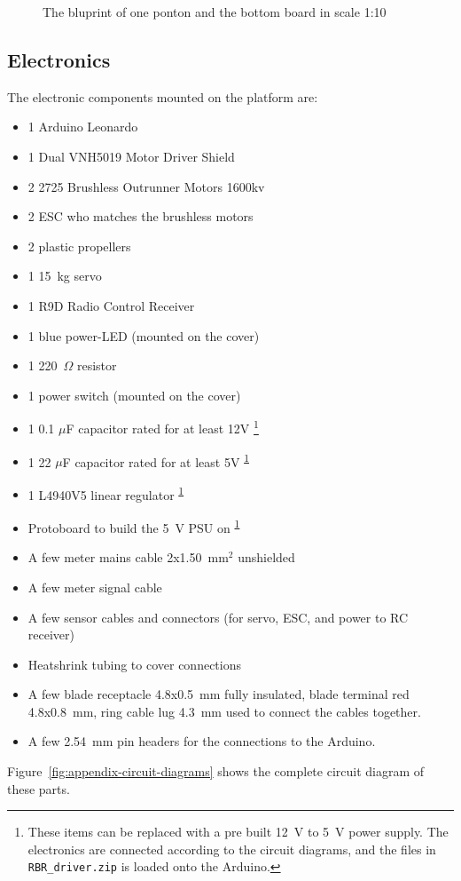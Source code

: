   \begin{figure}
    \centering

   
    \caption{The bluprint of one ponton and the bottom board in scale 1:10}
    \label{fig:appendix-blueprint-ponton}
\end{figure}
\subsection{Electronics}

The electronic components mounted on the platform are:

\begin{itemize}
  \item 1 Arduino Leonardo
  \item 1 Dual VNH5019 Motor Driver Shield
  \item 2 2725 Brushless Outrunner Motors 1600kv
  \item 2 ESC who matches the brushless motors
  \item 2 plastic propellers
  \item 1 15~kg servo
  \item 1 R9D Radio Control Receiver
  \item 1 blue power-LED (mounted on the cover)
  \item 1 220~$\Omega$ resistor
  \item 1 power switch (mounted on the cover)
  \item 1 0.1 $\mu$F capacitor rated for at least 12V \footnote{\label{fotnot_app} These items can be replaced with a pre built 12~V to 5~V power supply. The electronics are connected according to the circuit diagrams, and the files in \texttt{RBR\_driver.zip} is loaded onto the Arduino.} %
  \item 1 22 $\mu$F capacitor rated for at least 5V \textsuperscript{\ref{fotnot_app}}
  \item 1 L4940V5 linear regulator \textsuperscript{\ref{fotnot_app}}%
  \item Protoboard to build the 5~V PSU on \textsuperscript{\ref{fotnot_app}} 
  \item A few meter mains cable 2x1.50~mm$^2$ unshielded
  \item A few meter signal cable
  \item A few sensor cables and connectors (for servo, ESC, and power to RC receiver) 
  \item Heatshrink tubing to cover connections
  \item A few blade receptacle 4.8x0.5~mm fully insulated, blade terminal red
    4.8x0.8~mm, ring cable lug 4.3~mm used to connect the cables together.
  \item A few 2.54~mm pin headers for the connections to the Arduino.
\end{itemize}
 Figure~\ref{fig:appendix-circuit-diagrams} shows the complete circuit diagram of these parts.

